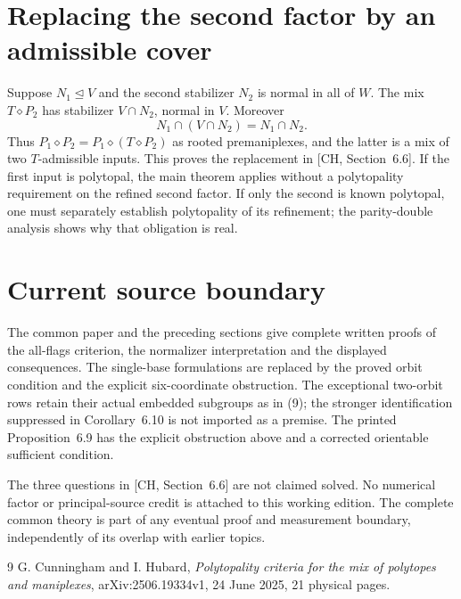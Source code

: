 \documentclass[a4paper,11pt]{article}
\newcommand{\mix}{\mathbin{\diamond}}\newcommand{\Alt}{\operatorname{Alt}}
\begin{document}
\section{Replacing the second factor by an admissible cover}
Suppose $N_1\trianglelefteq V$ and the second stabilizer $N_2$ is normal
in all of $W$. The mix $T\mix P_2$ has stabilizer $V\cap N_2$, normal
in $V$. Moreover
\[
 N_1\cap(V\cap N_2)=N_1\cap N_2.
\]
Thus $P_1\mix P_2=P_1\mix(T\mix P_2)$ as rooted premaniplexes,
and the latter is a mix of two $T$-admissible inputs. This proves the
replacement in [CH, Section~6.6]. If the first input is polytopal, the
main theorem applies without a polytopality requirement on the refined
second factor. If only the second is known polytopal, one must separately
establish polytopality of its refinement; the parity-double analysis
shows why that obligation is real.

\section{Current source boundary}
The common paper and the preceding sections give complete written proofs of the
all-flags criterion, the normalizer interpretation and the displayed
consequences. The single-base formulations are replaced by the proved orbit condition
and the explicit six-coordinate obstruction. The exceptional two-orbit
rows retain their actual embedded subgroups as in (9); the stronger
identification suppressed in Corollary~6.10 is not imported as a premise. The printed Proposition~6.9 has the explicit
obstruction above and a corrected orientable sufficient condition.

The three questions in [CH, Section~6.6] are not claimed solved. No
numerical factor or principal-source credit is attached to this working
edition. The complete common theory is part of any eventual proof and
measurement boundary, independently of its overlap with earlier topics.

\begin{thebibliography}{9}
 G. Cunningham and I. Hubard, \emph{Polytopality criteria for the
mix of polytopes and maniplexes}, arXiv:2506.19334v1, 24 June 2025,
21 physical pages.
\end{thebibliography}
\end{document}
